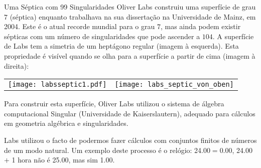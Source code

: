 \begin{surferPage}{Uma S\'eptica com 99 Singularidades}
    Oliver Labs construiu uma superf\'icie de grau $7$ (s\'eptica) enquanto trabalhava na sua disserta\c c\~ao na Universidade de Mainz, em 2004. Este \'e o atual recorde mundial para o grau $7$, mas ainda podem existir s\'epticas com um n\'umero de singularidades que pode ascender a $104$.  
    A superf\'icie de Labs tem a simetria de um hept\'agono regular (imagem \`a esquerda).
   Esta propriedade \'e vis\'ivel quando se olha para a superf\'icie a partir de cima (imagem \`a direita):

    \vspace*{-0.3em}
    \begin{center}
      \begin{tabular}{c@{\qquad}c}
        \texttt{[image: labsseptic1.pdf]}
        &
        \texttt{[image: labs\_septic\_von\_oben]}
      \end{tabular}
    \end{center}
    \vspace*{-0.3em}

    Para construir esta superf\'icie, Oliver Labs utilizou o sistema de \'algebra computacional {\sc Singular} (Universidade de Kaiserslautern),  adequado para c\'alculos em geometria alg\'ebrica e singularidades.

    Labs utilizou o facto de podermos fazer c\'alculos com conjuntos finitos de n\'umeros de um modo natural. Um exemplo deste processo \'e o rel\'ogio: 24.00$=$0.00, 24.00 $+$ 1 hora n\~ao \'e
    25.00, mas sim 1.00.
\end{surferPage}
